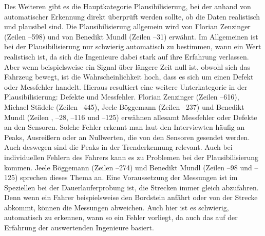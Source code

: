 Des Weiteren gibt es die Hauptkategorie Plausibilisierung, bei der anhand von automatischer Erkennung direkt überprüft werden sollte, ob die Daten  realistisch und plausibel sind. Die Plausibilisierung allgemein wird von Florian Zenzinger (Zeilen --598) und von Benedikt Mundl (Zeilen --31) erwähnt. Im Allgemeinen ist bei der Plausibilisierung nur schwierig automatisch zu bestimmen, wann ein Wert realistisch ist, da sich die Ingenieure dabei stark auf ihre Erfahrung verlassen. Aber wenn beispielsweise ein Signal über längere Zeit null ist, obwohl sich das Fahrzeug  bewegt, ist die Wahrscheinlichkeit hoch, dass es sich um einen Defekt oder Messfehler handelt. Hieraus resultiert eine weitere Unterkategorie in der Plausibilisierung: Defekte und Messfehler. Florian Zenzinger (Zeilen --616), Michael Städele (Zeilen --445), Jeele Böggemann (Zeilen --237) und Benedikt Mundl (Zeilen , --28, --116 und --125) erwähnen allesamt Messfehler oder Defekte an den Sensoren. Solche Fehler erkennt man laut den Interviewten häufig an Peaks, Ausreißern oder an Nullwerten, die von den Sensoren gesendet werden. Auch deswegen sind die Peaks in der Trenderkennung  relevant. Auch bei individuellen Fehlern des Fahrers kann es zu Problemen bei der Plausibilisierung kommen. Jeele Böggemann (Zeilen --274) und Benedikt Mundl (Zeilen --98 und --125) sprechen dieses Thema an. Eine Voraussetzung der Messungen ist im Speziellen bei der Dauerlauferprobung ist, die Strecken immer gleich abzufahren. Denn wenn ein Fahrer beispielsweise den Bordstein anfährt oder von der Strecke abkommt, können die Messungen abweichen. Auch hier ist es schwierig, automatisch zu erkennen, wann so ein Fehler vorliegt, da auch das auf der Erfahrung der auswertenden Ingenieure basiert.

